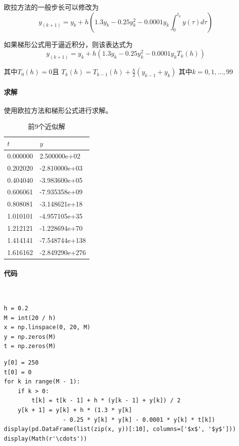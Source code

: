 欧拉方法的一般步长可以修改为
$$y_(k+1)=y_k+h(1.3y_k-0.25y_k^2-0.0001y_k\int_{0}^{t_k}y(\tau)d\tau)$$


如果梯形公式用于逼近积分，则该表达式为
$$y_(k+1)=y_k+h(1.3y_k-0.25y_k^2-0.0001y_k T_k (h))$$

其中$T_0 (h)=0$且
$T_k (h)=T_{k-1}(h)+\frac{h}{2} (y_{k-1}+y_k )$  其中$ k=0,1,…,99$

\paragraph{求解} 使用欧拉方法和梯形公式进行求解。

\begin{table}[H]
	\centering
	\caption{前9个近似解}
	\begin{tabular}{ll}
		\hline
		$t$      & $y$            \\ \hline
		0.000000 & 2.500000e+02   \\
		0.202020 & -2.810000e+03  \\
		0.404040 & -3.983600e+05  \\
		0.606061 & -7.935358e+09  \\
		0.808081 & -3.148621e+18  \\
		1.010101 & -4.957105e+35  \\
		1.212121 & -1.228694e+70  \\
		1.414141 & -7.548744e+138 \\
		1.616162 & -2.849290e+276 \\ \hline
	\end{tabular}
\end{table}

\paragraph{代码}
~\\
\begin{verbatim}
h = 0.2
M = int(20 / h)
x = np.linspace(0, 20, M)
y = np.zeros(M)
t = np.zeros(M)
\end{verbatim}
\begin{verbatim}
y[0] = 250
t[0] = 0
for k in range(M - 1):
    if k > 0:
        t[k] = t[k - 1] + h * (y[k - 1] + y[k]) / 2
    y[k + 1] = y[k] + h * (1.3 * y[k] 
                 - 0.25 * y[k] * y[k] - 0.0001 * y[k] * t[k])
display(pd.DataFrame(list(zip(x, y))[:10], columns=['$x$', '$y$']))
display(Math(r'\cdots'))
\end{verbatim}

